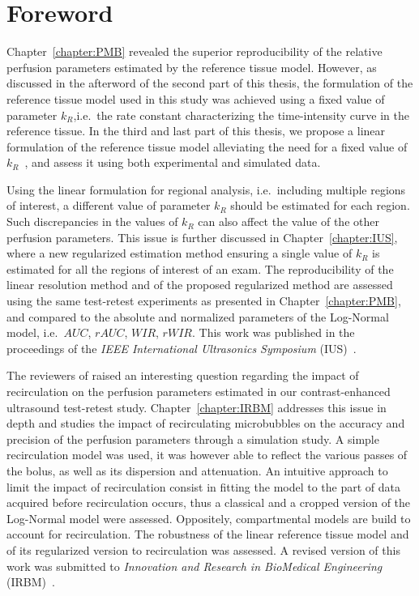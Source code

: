 \chapter*{Foreword}
Chapter~\ref{chapter:PMB} revealed the superior reproducibility of the relative perfusion parameters estimated by the reference tissue model.
However, as discussed in the afterword of the second part of this thesis, the formulation of the reference tissue model used in this study was achieved using a fixed value of parameter $k_R$,i.e.~the rate constant characterizing the time-intensity curve in the reference tissue.
In the third and last part of this thesis, we propose a linear formulation of the reference tissue model alleviating the need for a fixed value of $k_R$~\cite{CardenasRodriguez:2013em}, and assess it using both experimental and simulated data.

Using the linear formulation for regional analysis, i.e.~including multiple regions of interest, a different value of parameter $k_R$ should be estimated for each region.
Such discrepancies in the values of $k_R$ can also affect the value of the other perfusion parameters.
This issue is further discussed in Chapter~\ref{chapter:IUS}, where a new regularized estimation method ensuring a single value of $k_R$ is estimated for all the regions of interest of an exam.
The reproducibility of the linear resolution method and of the proposed regularized method are assessed using the same test-retest experiments as presented in Chapter~\ref{chapter:PMB}, and compared to the absolute and normalized parameters of the Log-Normal model, i.e.~$AUC$, $rAUC$, $WIR$, $rWIR$.
This work was published in the proceedings of the {\em IEEE International Ultrasonics Symposium} (IUS)~\cite{Doury:2016fi}.

The reviewers of \cite{Doury:2016fi} raised an interesting question regarding the impact of recirculation on the perfusion parameters estimated in our contrast-enhanced ultrasound test-retest study.
Chapter~\ref{chapter:IRBM} addresses this issue in depth and studies the impact of recirculating microbubbles on the accuracy and precision of the perfusion parameters through a simulation study.
A simple recirculation model was used, it was however able to reflect the various passes of the bolus, as well as its dispersion and attenuation.
An intuitive approach to limit the impact of recirculation consist in fitting the model to the part of data acquired before recirculation occurs, thus a classical and a cropped version of the Log-Normal model were assessed.
Oppositely, compartmental models are build to account for recirculation.
The robustness of the linear reference tissue model and of its regularized version to recirculation was assessed.
A revised version of this work was submitted to {\em Innovation and Research in BioMedical Engineering} (IRBM)~\cite{Doury:2017vv}.

